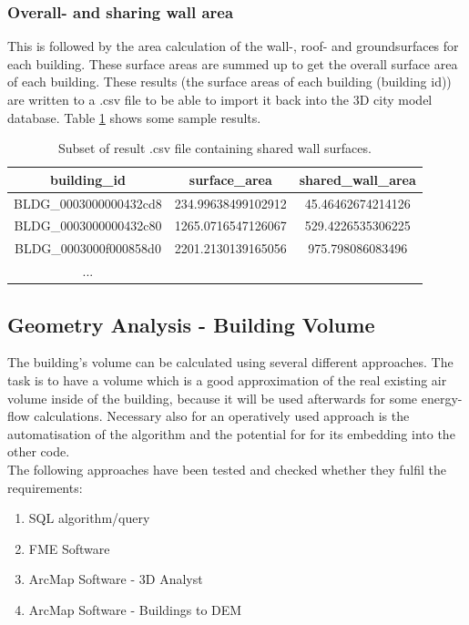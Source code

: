 \subsubsection{Overall- and sharing wall area}
This is followed by the area calculation of the wall-, roof- and groundsurfaces for each building. These surface areas are summed up to get the overall surface area of each building.
These results (the surface areas of each building (building id)) are written to a .csv file to be able to import it back into the 3D city model database. Table \ref{table:result shared wall surfaces} shows some sample results.
\begin{table}[b]
\centering
\begin{tabular}{c  c  c}
building\_id & surface\_area & shared\_wall\_area\\
\hline						
BLDG\_0003000000432cd8 & 234.99638499102912 & 45.46462674214126\\
BLDG\_0003000000432c80 & 1265.0716547126067 & 529.4226535306225\\
BLDG\_0003000f000858d0 & 2201.2130139165056 & 975.798086083496\\
...\\
\end{tabular}
\caption{Subset of result .csv file containing shared wall surfaces.} 
\label{table:result shared wall surfaces}
\end{table}

\subsection{Geometry Analysis - Building Volume}
The building's volume can be calculated using several different approaches. The task is to have a volume which is a good approximation of the real existing air volume inside of the building, because it will be used afterwards for some energy-flow calculations. Necessary also for an operatively used approach is the automatisation of the algorithm and the potential for for its embedding into the other code.\\
The following approaches have been tested and checked whether they fulfil the requirements:
\begin{enumerate}
\item SQL algorithm/query
\item FME Software
\item ArcMap Software - 3D Analyst
\item ArcMap Software - Buildings to DEM
\end{enumerate}



